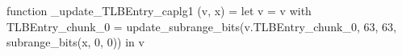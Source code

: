 function _update_TLBEntry_caplg1 (v, x) = let v = { v with TLBEntry_chunk_0 = update_subrange_bits(v.TLBEntry_chunk_0, 63, 63, subrange_bits(x, 0, 0)) } in
  v
